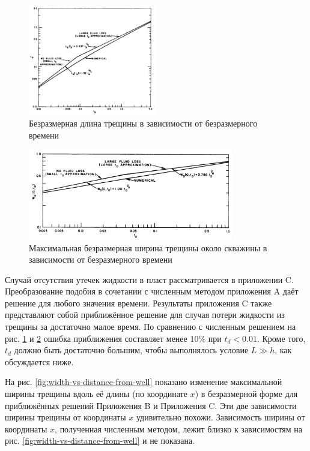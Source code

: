 \documentclass[a4paper, 12pt]{article}
\begin{document}
\begin{figure}[H]
\center
\includegraphics[width=0.5\textwidth]{length_vs_time}
\caption{Безразмерная длина трещины в зависимости от безразмерного времени} 
\label{fig:length-vs-time}  
\end{figure}


\begin{figure}[H]
\center
\includegraphics[width=0.8\textwidth]{maximum_width_at_well_vs_time}
\caption{Максимальная безразмерная ширина трещины около скважины в зависимости от безразмерного времени} 
\label{fig:width-at-well-vs-time}  
\end{figure}

Случай отсутствия утечек жидкости в пласт рассматривается в приложении C.
Преобразование подобия в сочетании с численным методом приложения A даёт решение для любого значения времени.
Результаты приложения C также представляют собой приближённое решение для случая потери жидкости из трещины за достаточно малое время.
По сравнению с численным решением на рис. \ref{fig:length-vs-time} и \ref{fig:width-at-well-vs-time} ошибка приближения составляет менее 10\% при $t_d<0.01$.
Кроме того, $t_d$ должно быть достаточно большим, чтобы выполнялось условие $L\gg h$, как обсуждается ниже.

На рис. \ref{fig:width-vs-distance-from-well} показано изменение максимальной ширины трещины вдоль её длины (по координате $x$) в безразмерной форме для приближённых решений Приложения B и Приложения C.
Эти две зависимости ширины трещины от координаты $x$ удивительно похожи.
Зависимость ширины от координаты $x$, полученная численным методом, лежит близко к зависимостям на рис. \ref{fig:width-vs-distance-from-well} и не показана.
\end{document}
